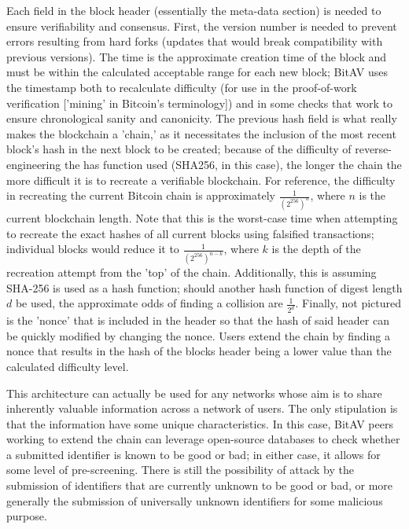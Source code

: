 \documentclass[12pt,journal]{IEEEtran}
\begin{document}
Each field in the block header (essentially the meta-data section) is needed to ensure verifiability and consensus. First, the version number is needed to prevent errors resulting from hard forks (updates that would break compatibility with previous versions). The time is the approximate creation time of the block and must be within the calculated acceptable range for each new block; BitAV uses the timestamp both to recalculate difficulty (for use in the proof-of-work verification ['mining' in Bitcoin's terminology]) and in some checks that work to ensure chronological sanity and canonicity. The previous hash field is what really makes the blockchain a 'chain,' as it necessitates the inclusion of the most recent block's hash in the next block to be created; because of the difficulty of reverse-engineering the has function used (SHA256, in this case), the longer the chain the more difficult it is to recreate a verifiable blockchain. For reference, the difficulty in recreating the current Bitcoin chain is approximately $\frac{1}{(2^{256})^{n}}$, where $n$ is the current blockchain length. Note that this is the worst-case time when attempting to recreate the exact hashes of all current blocks using falsified transactions; individual blocks would reduce it to $\frac{1}{(2^{256})^{n-k}}$, where $k$ is the depth of the recreation attempt from the 'top' of the chain. Additionally, this is assuming SHA-256 is used as a hash function; should another hash function of digest length $d$ be used, the approximate odds of finding a collision are $\frac{1}{2^d}$. Finally, not pictured is the 'nonce' that is included in the header so that the hash of said header can be quickly modified by changing the nonce. Users extend the chain by finding a nonce that results in the hash of the blocks header being a lower value than the calculated difficulty level\cite{Nakamoto2008}.\par

This architecture can actually be used for any networks whose aim is to share inherently valuable information across a network of users. The only stipulation is that the information have some unique characteristics. In this case, BitAV peers working to extend the chain can leverage open-source databases to check whether a submitted identifier is known to be good or bad; in either case, it allows for some level of pre-screening. There is still the possibility of attack by the submission of identifiers that are currently unknown to be good or bad, or more generally the submission of universally unknown identifiers for some malicious purpose.\par
\end{document}
